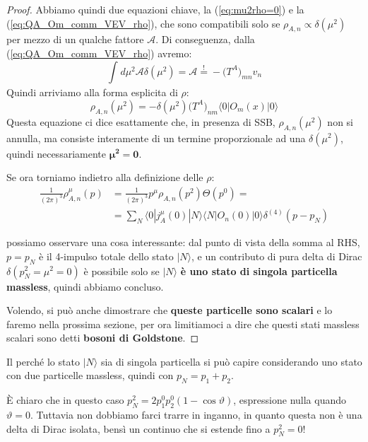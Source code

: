 \documentclass[../main.tex]{subfiles}
\begin{document}
\begin{proof}
    Abbiamo quindi due equazioni chiave, la (\ref{eq:mu2rho=0}) e la (\ref{eq:QA_Om_comm_VEV_rho}), che sono compatibili solo se ${\rho}_{A,n}\propto \delta(\mu^2)$ per mezzo di un qualche fattore $\mathscr A$. Di conseguenza, dalla (\ref{eq:QA_Om_comm_VEV_rho}) avremo:
    \[
    \int_{}d\mu^2\mathscr{A}\delta(\mu^2) = \mathscr{A} \overset{!}{=}  - \big(T^A\big)_{mn}v_n 
    \]
    Quindi arriviamo alla forma esplicita di $\rho$:
    \begin{equation}
        \boxed{{\rho}_{A,n}(\mu^2) = - \delta(\mu^2)\big(T^A\big)_{nm}\langle0|O_m(x)|0\rangle}
        \label{eq:rho_explicit_form}
    \end{equation}
    Questa equazione ci dice esattamente che, in presenza di SSB, ${\rho}_{A,n}(\mu^2)$ non si annulla, ma consiste interamente di un termine proporzionale ad una $\delta(\mu^2)$, quindi necessariamente $\mathbf{\mu^2=0}$.

    Se ora torniamo indietro alla definizione delle $\rho$:
    \begin{equation}
        \begin{aligned}
            \frac{1}{(2\pi)^3}\rho^\mu_{A,n}(p) &= \frac{1}{(2\pi)^3}p^\mu \rho_{A,n}(p^2)\Theta(p^0) =\\ &=  \sum_N\langle 0|j^\mu_A(0) |N\rangle\langle N| O_n(0)|0\rangle \delta^{(4)}(p-p_N)
        \end{aligned}
        \label{eq:rho_structure}
    \end{equation}
    
    possiamo osservare una cosa interessante: dal punto di vista della somma al RHS, $p=p_N$ è il 4-impulso totale dello stato $|N\rangle$, e un contributo di pura delta di Dirac $\delta(p_N^2=\mu^2=0)$ è possibile solo se $|N\rangle$ \textbf{è uno stato di singola particella massless}, quindi abbiamo concluso.

    Volendo, si può anche dimostrare che \textbf{queste particelle sono scalari} e lo faremo nella prossima sezione, per ora limitiamoci a dire che questi stati massless scalari sono detti \textbf{bosoni di Goldstone}.
\end{proof}
\begin{nota}
    Il perché lo stato $|N\rangle$ sia di singola particella si può capire considerando uno stato con due particelle massless, quindi con $p_N=p_1+p_2$. 

    È chiaro che in questo caso $p_N^2 = 2p_1^0p_2^0(1-\cos\vartheta)$, espressione nulla quando $\vartheta=0$. Tuttavia non dobbiamo farci trarre in inganno, in quanto questa non è una delta di Dirac isolata, bensì un continuo che si estende fino a $p_N^2=0$!
\end{nota}
\end{document}

